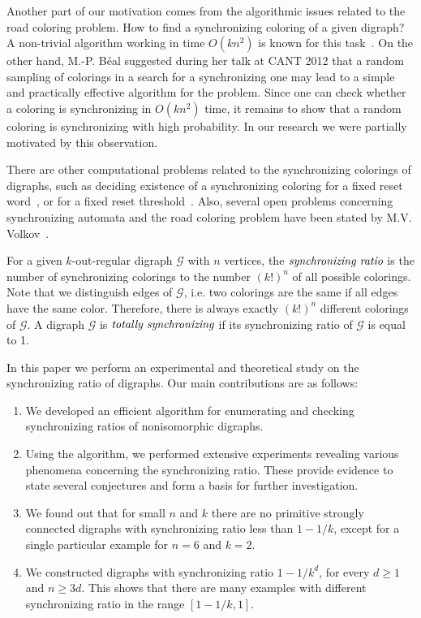 \documentclass[runningheads]{llncs}
\begin{document}
Another part of our motivation comes from the algorithmic issues related to the road coloring problem. How to find a synchronizing coloring of a given digraph?
A non-trivial algorithm working in time $O(kn^2)$ is known for this task~\cite{BealPerrin2014AQuadraticAlgorithmForRoadColoring}. On the other hand, M.-P. B{\'e}al suggested during her talk at CANT 2012 that a random sampling of colorings in a search for a synchronizing one may lead to a simple and practically effective algorithm for the problem. Since one can check whether a coloring is synchronizing in $O(kn^2)$ time, it remains to show that a random coloring is synchronizing with high probability. In our research we were partially motivated by this observation.

There are other computational problems related to the synchronizing colorings of digraphs, such as deciding existence of a synchronizing coloring for a fixed reset word~\cite{VorelRoman2015ComplexityOfRoadColoringWithPrescribedResetWords}, or for a fixed reset threshold~\cite{Roman2012P-NPThresholdForSynchronizingRoadColoring}.
Also, several open problems concerning synchronizing automata and the road coloring problem have been stated by M.V. Volkov~\cite{Volkov2008OpenProblemsOnSynchronizingAutomata}.





For a given $k$-out-regular digraph $\mathcal{G}$ with $n$ vertices,
the $\emph{synchronizing ratio}$ is the number of synchronizing colorings to the number $(k!)^n$ of all possible colorings.
Note that we distinguish edges of $\mathcal{G}$, i.e. two colorings are the same if all edges have the same color. Therefore, there is always exactly $(k!)^n$ different colorings of $\mathcal{G}$.
A digraph $\mathcal{G}$ is $\emph{totally synchronizing}$ if its synchronizing ratio of $\mathcal{G}$ is equal to 1.

In this paper we perform an experimental and theoretical study on the synchronizing ratio of digraphs. Our main contributions are as follows:
\begin{enumerate}
\item We developed an efficient algorithm for enumerating and checking synchronizing ratios of nonisomorphic digraphs.
\item Using the algorithm, we performed extensive experiments revealing various phenomena concerning the synchronizing ratio.
These provide evidence to state several conjectures and form a basis for further investigation.
\item We found out that for small $n$ and $k$ there are no primitive strongly connected digraphs with synchronizing ratio less than $1-1/k$, except for a single particular example for $n=6$ and $k=2$.
\item We constructed digraphs with synchronizing ratio $1-1/k^d$, for every $d \ge 1$ and $n\ge 3d$. This shows that there are many examples with different synchronizing ratio in the range $[1-1/k,1]$.
\end{enumerate}
\end{document}
